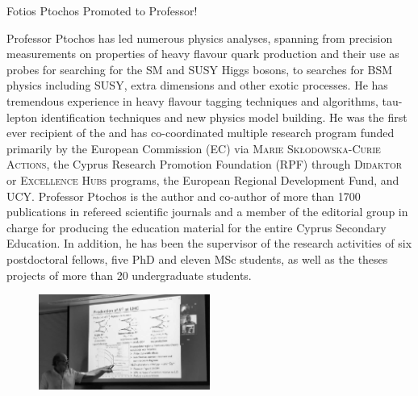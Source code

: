 \begin{multicols*}{2}
\begin{headline}[enhanced, tikz={rotate=0}]{Fotios Ptochos Promoted to Professor!}
\begin{multicols}{2}
    Professor Ptochos has led numerous physics analyses, spanning
    from precision measurements on properties of heavy flavour quark
    production and their use as probes for searching for the SM and SUSY
    Higgs bosons, to searches for BSM physics including SUSY, extra
    dimensions and other exotic processes. He has tremendous experience in
    heavy flavour tagging techniques and algorithms, tau-lepton
    identification techniques and new physics model building. 
    He was the first ever recipient of the  and has co-coordinated multiple research program
    funded primarily by the European Commission (EC) via \textsc{Marie
    Skłodowska-Curie Actions},  the Cyprus Research Promotion
    Foundation (RPF) through \textsc{Didaktor} or \textsc{Excellence
      Hubs} programs, the European Regional Development Fund, and
    UCY. Professor Ptochos is the author and co-author of more than 
    1700 publications in refereed scientific journals and a member of the
    editorial group in charge for producing the education material
    for the entire Cyprus Secondary Education. In addition, he has
    been the supervisor of the research activities of six postdoctoral
    fellows, five PhD and eleven MSc students, as well as the theses
    projects of more than 20 undergraduate students. 

    \begin{figure}
      \begin{center}
        \leavevmode
        \includegraphics[width=0.5\textwidth]{./figures/Fotis7.png}
      \end{center}
    \end{figure}
    \end{multicols}
  \end{headline}

  \columnbreak
  
  
  
\end{multicols*}
